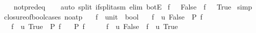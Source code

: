 \begin{isabellebody}
%
\isadelimproof
\ \ %
\endisadelimproof
%
\isatagproof
{}\isamarkupfalse%
\ not{\isacharunderscore}{\kern0pt}pred{\isacharunderscore}{\kern0pt}eq\isanewline
\ \ \isamarkupfalse%
\ {\isacharparenleft}{\kern0pt}auto\ split{\isacharcolon}{\kern0pt}\ if{\isacharunderscore}{\kern0pt}split{\isacharunderscore}{\kern0pt}asm\ elim{\isacharcolon}{\kern0pt}\ botE{\isacharparenright}{\kern0pt}%
\endisatagproof
{\isafoldproof}%
%
\isadelimproof
\isanewline
%
\endisadelimproof
{}\isamarkupfalse%
\ {\isachardoublequoteopen}f\ {\isacharparenleft}{\kern0pt}{\isacharparenright}{\kern0pt}\ {\isacharequal}{\kern0pt}\ False\ {\isasymor}\ f\ {\isacharparenleft}{\kern0pt}{\isacharparenright}{\kern0pt}\ {\isacharequal}{\kern0pt}\ True{\isachardoublequoteclose}\isanewline
%
\isadelimproof
%
\endisadelimproof
%
\isatagproof
{}\isamarkupfalse%
\ simp%
\endisatagproof
{\isafoldproof}%
%
\isadelimproof
\isanewline
%
\endisadelimproof
\isanewline
{}\isamarkupfalse%
\ closure{\isacharunderscore}{\kern0pt}of{\isacharunderscore}{\kern0pt}bool{\isacharunderscore}{\kern0pt}cases\ {\isacharbrackleft}{\kern0pt}no{\isacharunderscore}{\kern0pt}atp{\isacharbrackright}{\kern0pt}{\isacharcolon}{\kern0pt}\isanewline
\ \ \ f\ {\isacharcolon}{\kern0pt}{\isacharcolon}{\kern0pt}\ {\isachardoublequoteopen}unit\ {\isasymRightarrow}\ bool{\isachardoublequoteclose}\isanewline
\ \ \ {\isachardoublequoteopen}f\ {\isacharequal}{\kern0pt}\ {\isacharparenleft}{\kern0pt}{\isasymlambda}u{\isachardot}{\kern0pt}\ False{\isacharparenright}{\kern0pt}\ {\isasymLongrightarrow}\ P\ f{\isachardoublequoteclose}\isanewline
\ \ \ {\isachardoublequoteopen}f\ {\isacharequal}{\kern0pt}\ {\isacharparenleft}{\kern0pt}{\isasymlambda}u{\isachardot}{\kern0pt}\ True{\isacharparenright}{\kern0pt}\ {\isasymLongrightarrow}\ P\ f{\isachardoublequoteclose}\isanewline
\ \ \ {\isachardoublequoteopen}P\ f{\isachardoublequoteclose}\isanewline
%
\isadelimproof
%
\endisadelimproof
%
\isatagproof
{}\isamarkupfalse%
\ {\isacharminus}{\kern0pt}\isanewline
\ \ \isamarkupfalse%
\ {\isachardoublequoteopen}f\ {\isacharequal}{\kern0pt}\ {\isacharparenleft}{\kern0pt}{\isasymlambda}u{\isachardot}{\kern0pt}\ False{\isacharparenright}{\kern0pt}\ {\isasymor}\ f\ {\isacharequal}{\kern0pt}\ {\isacharparenleft}{\kern0pt}{\isasymlambda}u{\isachardot}{\kern0pt}\ True{\isacharparenright}{\kern0pt}{\isachardoublequoteclose}\isanewline
\ \ \ \ \isamarkupfalse%

\end{isabellebody}
